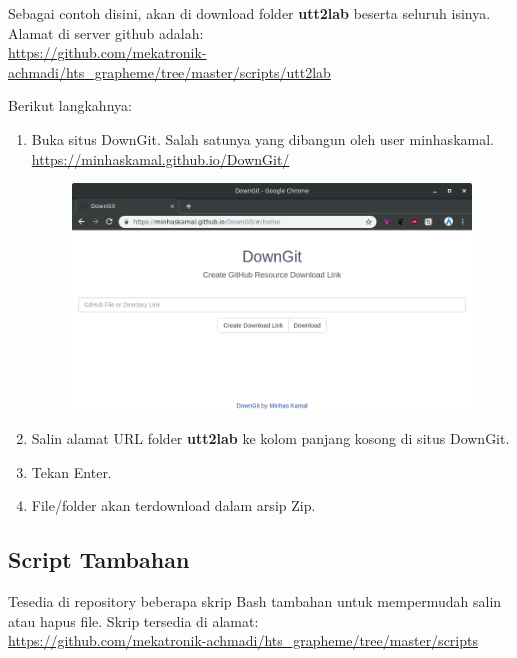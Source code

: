 \documentclass[12pt,]{article}
\begin{document}
	Sebagai contoh disini, akan di download folder \textbf{utt2lab} beserta seluruh isinya.
	Alamat di server github adalah:\\
	\url{https://github.com/mekatronik-achmadi/hts_grapheme/tree/master/scripts/utt2lab}

	Berikut langkahnya:
	\begin{enumerate}
		\item Buka situs DownGit.
		Salah satunya yang dibangun oleh user minhaskamal.\\
		\url{https://minhaskamal.github.io/DownGit/}

		\begin{figure}[!ht]
			\centering
			\includegraphics[width=450pt]{downgit.png}
		\end{figure}

		\item Salin alamat URL folder \textbf{utt2lab} ke kolom panjang kosong di situs DownGit.

		\item Tekan Enter.

		\item File/folder akan terdownload dalam arsip Zip.
	\end{enumerate}

	\subsection{Script Tambahan}

	Tesedia di repository beberapa skrip Bash tambahan untuk mempermudah salin atau hapus file.
	Skrip tersedia di alamat:\\
	\url{https://github.com/mekatronik-achmadi/hts_grapheme/tree/master/scripts}
\end{document}

